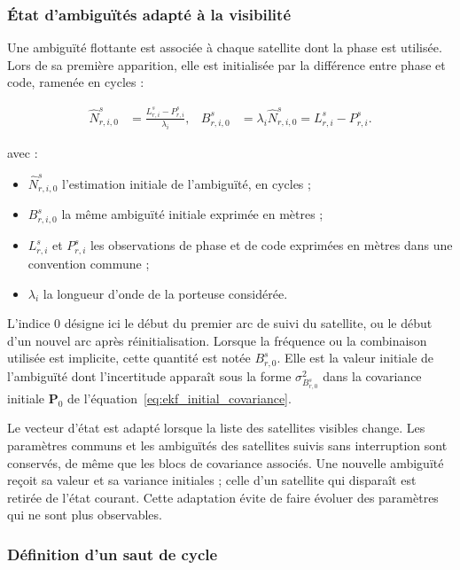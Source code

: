 \subsubsection{État d'ambiguïtés adapté à la visibilité}

Une ambiguïté flottante est associée à chaque satellite dont la phase est
utilisée. Lors de sa première apparition, elle est initialisée par la
différence entre phase et code, ramenée en cycles :

\begin{align}
\widehat N_{r,i,0}^s
&=
\frac{L_{r,i}^s-P_{r,i}^s}{\lambda_i},
&
B_{r,i,0}^s
&=
\lambda_i\widehat N_{r,i,0}^s
=L_{r,i}^s-P_{r,i}^s.
\label{eq:ambiguity_initialization}
\end{align}

avec :

\begin{itemize}
    \item $\widehat N_{r,i,0}^s$ l'estimation initiale de l'ambiguïté, en
    cycles ;
    \item $B_{r,i,0}^s$ la même ambiguïté initiale exprimée en mètres ;
    \item $L_{r,i}^s$ et $P_{r,i}^s$ les observations de phase et de code
    exprimées en mètres dans une convention commune ;
    \item $\lambda_i$ la longueur d'onde de la porteuse considérée.
\end{itemize}

L'indice $0$ désigne ici le début du premier arc de suivi du satellite, ou le
début d'un nouvel arc après réinitialisation. Lorsque la fréquence ou la
combinaison utilisée est implicite, cette quantité est notée $B_{r,0}^s$. Elle
est la valeur initiale de l'ambiguïté dont l'incertitude apparaît sous la forme
$\sigma_{B_{r,0}^s}^2$ dans la covariance initiale $\mathbf P_0$ de
l'équation~\eqref{eq:ekf_initial_covariance}.

Le vecteur d'état est adapté lorsque la liste des satellites visibles change.
Les paramètres communs et les ambiguïtés des satellites suivis sans
interruption sont conservés, de même que les blocs de covariance associés. Une
nouvelle ambiguïté reçoit sa valeur et sa variance initiales ; celle d'un
satellite qui disparaît est retirée de l'état courant. Cette adaptation évite
de faire évoluer des paramètres qui ne sont plus observables.

\subsubsection{Définition d'un saut de cycle}

